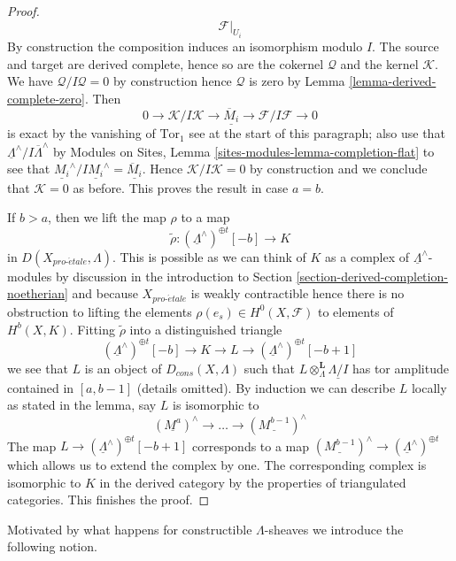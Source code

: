 \documentclass{stacks-project}
\theoremstyle{plain}
\theoremstyle{definition}
\theoremstyle{remark}
\numberwithin{equation}{subsection}
\def\proetale{{pro\text{-}\acute{e}tale}}
\begin{document}
\begin{proof}
$$\mathcal{F}|_{U_i}
$$
By construction the composition induces an isomorphism modulo $I$.
The source and target are derived complete, hence so are the cokernel
$\mathcal{Q}$ and the kernel $\mathcal{K}$. We have
$\mathcal{Q}/I\mathcal{Q} = 0$ by construction hence $\mathcal{Q}$
is zero by Lemma \ref{lemma-derived-complete-zero}.
Then
$$
0 \to \mathcal{K}/I\mathcal{K} \to
\underline{\overline{M}_i}
\to \mathcal{F}/I\mathcal{F} \to 0
$$
is exact by the vanishing of $\text{Tor}_1$ see at the start of this
paragraph; also use that
$\underline{\Lambda}^\wedge/I\overline{\Lambda}^\wedge$ by
Modules on Sites, Lemma \ref{sites-modules-lemma-completion-flat}
to see that
$\underline{M_i}^\wedge/I\underline{M_i}^\wedge = \underline{\overline{M}_i}$.
Hence $\mathcal{K}/I\mathcal{K} = 0$ by construction and we conclude
that $\mathcal{K} = 0$ as before. This proves the result in case $a = b$.

\medskip\noindent
If $b > a$, then we lift the map $\rho$ to a map
$$
\tilde \rho : (\underline{\Lambda}^\wedge)^{\oplus t}[-b] \longrightarrow K
$$
in $D(X_\proetale, \Lambda)$. This is possible as we can think of
$K$ as a complex of $\underline{\Lambda}^\wedge$-modules by
discussion in the introduction to
Section \ref{section-derived-completion-noetherian}
and because $X_\proetale$ is weakly contractible
hence there is no obstruction to lifting the elements
$\rho(e_s) \in H^0(X, \mathcal{F})$ to elements of $H^b(X, K)$.
Fitting $\tilde \rho$ into a distinguished triangle
$$
(\underline{\Lambda}^\wedge)^{\oplus t}[-b] \to K \to L \to
(\underline{\Lambda}^\wedge)^{\oplus t}[-b + 1]
$$
we see that $L$ is an object of $D_{cons}(X, \Lambda)$ such
that $L \otimes_\Lambda^\mathbf{L} \underline{\Lambda/I}$
has tor amplitude contained in $[a, b - 1]$ (details omitted).
By induction we can describe $L$ locally as stated in the lemma, say
$L$ is isomorphic to
$$
(\underline{M^a})^\wedge \to \ldots \to (\underline{M^{b - 1}})^\wedge
$$
The map
$L \to (\underline{\Lambda}^\wedge)^{\oplus t}[-b + 1]$
corresponds to a map
$(\underline{M^{b - 1}})^\wedge \to (\underline{\Lambda}^\wedge)^{\oplus t}$
which allows us to extend the complex by one. The corresponding
complex is isomorphic to $K$ in the derived category by the properties
of triangulated categories. This finishes the proof.
\end{proof}

\noindent
Motivated by what happens for constructible $\Lambda$-sheaves
we introduce the following notion.
\end{document}
